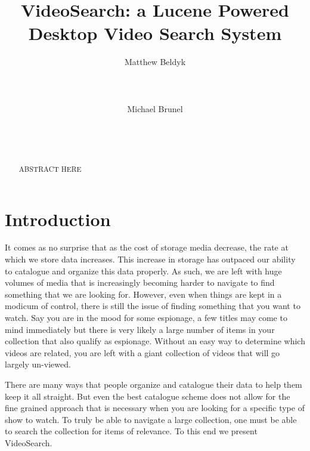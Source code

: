 \documentclass{acm_proc_article-sp}
\begin{document}
\title{VideoSearch: a Lucene Powered Desktop Video Search System}



%
\author{
\alignauthor
Matthew Beldyk\\
       \\
       \\
       \\
\alignauthor
Michael Brunel\\
       \\
       \\
       \\
}
\maketitle
\begin{abstract}

ABSTRACT HERE
\end{abstract}

\section{Introduction}
It comes as no surprise that as the cost of storage media decrease, the rate at which we store data increases. This increase in storage has outpaced our ability to catalogue and organize this data properly. As such, we are left with huge volumes of media that is increasingly becoming harder to navigate to find something that we are looking for. However, even when things are kept in a modicum of control, there is still the issue of finding something that you want to watch. Say you are in the mood for some espionage, a few titles may come to mind immediately but there is very likely a large number of items in your collection that also qualify as espionage. Without an easy way to determine which videos are related, you are left with a giant collection of videos that will go largely un-viewed.

    There are many ways that people organize and catalogue their data to help them keep it all straight. But even the best catalogue scheme does not allow for the fine grained approach that is necessary when you are looking for a specific type of show to watch. To truly be able to navigate a large collection, one must be able to search the collection for items of relevance. To this end we present VideoSearch.  
\end{document}
